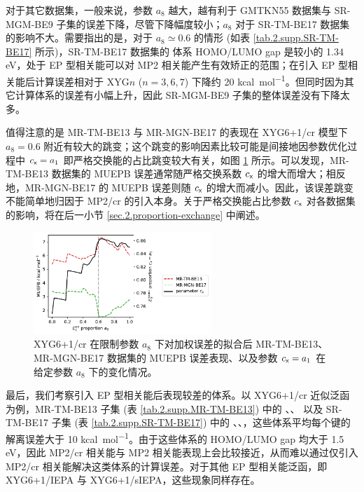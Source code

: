 对于其它数据集，一般来说，参数 $a_8$ 越大，越有利于 GMTKN55 数据集与 SR-MGM-BE9 子集的误差下降，尽管下降幅度较小；$a_8$ 对于 SR-TM-BE17 数据集的影响不大。需要指出的是，对于 $a_8 \simeq 0.6$ 的情形 (如表 \ref{tab.2.supp.SR-TM-BE17} 所示)，SR-TM-BE17 数据集的  体系 HOMO/LUMO gap 是较小的 1.34 eV，处于 EP 型相关能可以对 MP2 相关能产生有效矫正的范围；在引入 EP 型相关能后计算误差相对于 XYG$n$ ($n=3,6,7$) 下降约 20 \si{kcal.mol^{-1}}。但同时因为其它计算体系的误差有小幅上升，因此 SR-MGM-BE9 子集的整体误差没有下降太多。

值得注意的是 MR-TM-BE13 与 MR-MGN-BE17 的表现在 XYG6+1/cr 模型下 $a_8 = 0.6$ 附近有较大的跳变；这个跳变的影响因素比较可能是间接地因参数优化过程中 $c_{\textsf{x}} = a_1$ 即严格交换能的占比跳变较大有关，如图 \ref{fig.2.plot-seq-cr-against-cx} 所示。可以发现，MR-TM-BE13 数据集的 MUEPB 误差通常随严格交换系数 $c_{\textsf{x}}$ 的增大而增大；相反地，MR-MGN-BE17 的 MUEPB 误差则随 $c_{\textsf{x}}$ 的增大而减小。因此，该误差跳变不能简单地归因于 MP2/cr 的引入本身。关于严格交换能占比参数 $c_{\textsf{x}}$ 对各数据集的影响，将在后一小节 \ref{sec.2.proportion-exchange} 中阐述。

\begin{figure}[t]
  \centering
  \includegraphics[width=0.6\textwidth]{assets/plot-seq-cr-against-cx.pdf}
  \caption[XYG6+1/cr 在限制参数 $E_\textmt{c}^\textmt{EP}$ 占比系数下误差与 $E_\textmt{x}^\textmt{exact}$ 系数表现]{XYG6+1/cr 在限制参数 $a_8$ 下对加权误差的拟合后 MR-TM-BE13、MR-MGN-BE17 数据集的 MUEPB 误差表现、以及参数 $c_{\textsf{x}} = a_1$ 在给定参数 $a_8$ 下的变化情况。}
  \label{fig.2.plot-seq-cr-against-cx}
\end{figure}

最后，我们考察引入 EP 型相关能后表现较差的体系。以 XYG6+1/cr 近似泛函为例，MR-TM-BE13 子集 (表 \ref{tab.2.supp.MR-TM-BE13}) 中的 、、 以及 SR-TM-BE17 子集 (表 \ref{tab.2.supp.SR-TM-BE17}) 中的 、、，这些体系平均每个键的解离误差大于 10 \si{kcal.mol^{-1}}。由于这些体系的 HOMO/LUMO gap 均大于 1.5 eV，因此 MP2/cr 相关能与 MP2 相关能表现上会比较接近，从而难以通过仅引入 MP2/cr 相关能解决这类体系的计算误差。对于其他 EP 型相关能泛函，即 XYG6+1/IEPA 与 XYG6+1/sIEPA，这些现象同样存在。

